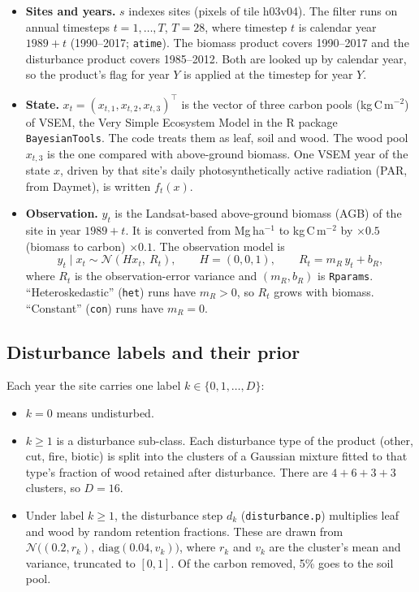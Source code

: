 \documentclass[11pt]{article}
\newcommand{\Norm}{\mathcal{N}}
\newcommand{\code}[1]{\texttt{#1}}
\begin{document}
\begin{itemize}
  \item \textbf{Sites and years.} $s$ indexes sites (pixels of tile h03v04). The filter runs
  on annual timesteps $t = 1,\dots,T$, $T = 28$, where timestep $t$ is calendar year
  $1989 + t$ (1990--2017; \code{atime}). The biomass product covers 1990--2017 and the
  disturbance product covers 1985--2012. Both are looked up by calendar year, so the
  product's flag for year $Y$ is applied at the timestep for year $Y$.
  \item \textbf{State.} $x_t = (x_{t,1}, x_{t,2}, x_{t,3})^\top$ is the vector of three carbon
  pools (kg\,C\,m$^{-2}$) of VSEM, the Very Simple Ecosystem Model in the R package
  \code{BayesianTools}. The code treats them as leaf, soil and wood. The wood pool
  $x_{t,3}$ is the one compared with above-ground biomass. One VSEM year of the state
  $x$, driven by that site's daily photosynthetically active radiation (PAR, from
  Daymet), is written $f_t(x)$.
  \item \textbf{Observation.} $y_t$ is the Landsat-based above-ground biomass (AGB) of the
  site in year $1989+t$. It is converted from Mg\,ha$^{-1}$ to kg\,C\,m$^{-2}$ by
  $\times 0.5$ (biomass to carbon) $\times 0.1$. The observation model is
  \[
    y_t \mid x_t \sim \Norm(Hx_t,\ R_t), \qquad H = (0,0,1), \qquad R_t = m_R\,y_t + b_R ,
  \]
  where $R_t$ is the observation-error variance and $(m_R, b_R)$ is \code{Rparams}.
  ``Heteroskedastic'' (\code{het}) runs have $m_R > 0$, so $R_t$ grows with biomass.
  ``Constant'' (\code{con}) runs have $m_R = 0$.
\end{itemize}

\subsection{Disturbance labels and their prior}

Each year the site carries one label $k \in \{0, 1, \dots, D\}$:
\begin{itemize}
  \item $k = 0$ means undisturbed.
  \item $k \ge 1$ is a disturbance sub-class. Each disturbance type of the product
  (other, cut, fire, biotic) is split into the clusters of a Gaussian mixture fitted to
  that type's fraction of wood retained after disturbance. There are $4 + 6 + 3 + 3$
  clusters, so $D = 16$.
  \item Under label $k \ge 1$, the disturbance step $d_k$
  (\code{disturbance.p}) multiplies leaf and wood by random retention fractions. These are
  drawn from $\Norm\big((0.2, r_k),\ \mathrm{diag}(0.04, v_k)\big)$, where $r_k$ and $v_k$
  are the cluster's mean and variance, truncated to $[0, 1]$. Of the carbon removed, 5\%
  goes to the soil pool.
\end{itemize}
\end{document}
